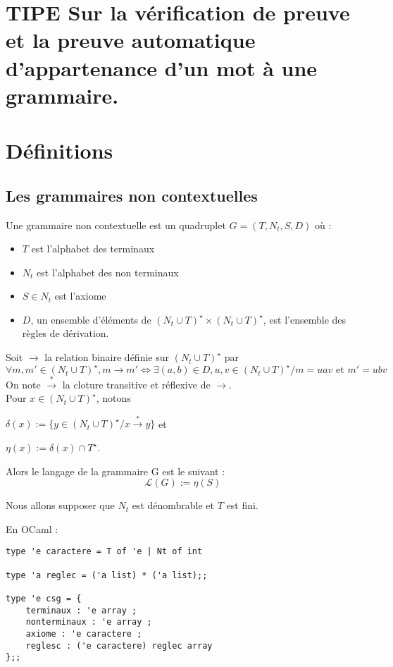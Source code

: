 \documentclass[a4paper,10pt]{article}
\title{\letitle}
\author{\leauthor}
\date{}
\begin{document}
    \section{TIPE Sur la vérification de preuve et la preuve automatique d'appartenance d'un mot à une grammaire.}

\section{Définitions}

\subsection{Les grammaires non contextuelles}

Une grammaire non contextuelle est un quadruplet $G = (T,N_t,S,D)$ où :

\begin{itemize}
\item $T$ est l'alphabet des terminaux
\item $N_t$ est l'alphabet des non terminaux
\item $S \in N_t$ est l'axiome
\item $D$, un ensemble d'éléments de $(N_t \cup T)^\star \times (N_t \cup T)^\star$, est l'ensemble des règles de dérivation.
\end{itemize}

Soit $\rightarrow$ la relation binaire définie sur $(N_t \cup T)^\star$ par
\begin{equation}
\forall m,m' \in (N_t \cup T)^\star, m \rightarrow m' \iff \exists (a,b) \in D, u,v \in (N_t \cup T)^\star / m = uav \text{ et } m' = ubv
\end{equation}
On note $\overset{*}{\rightarrow}$ la cloture transitive et réflexive de $\rightarrow$.\\
Pour $x \in (N_t \cup T)^\star$, notons

$\delta(x) := \{y \in (N_t \cup T)^\star / x \overset{*}{\rightarrow} y\}$
et 

$\eta(x) := \delta(x) \cap T^\star$.

Alors le langage de la grammaire G est le suivant :
\begin{equation*}\mathcal{L} (G) := \eta(S)\end{equation*}

Nous allons supposer que $N_t$ est dénombrable et $T$ est fini.

En OCaml :
\begin{verbatim}
type 'e caractere = T of 'e | Nt of int

type 'a reglec = ('a list) * ('a list);;

type 'e csg = {
    terminaux : 'e array ;
    nonterminaux : 'e array ;
    axiome : 'e caractere ;
    reglesc : ('e caractere) reglec array 
};;
\end{verbatim}
\end{document}

